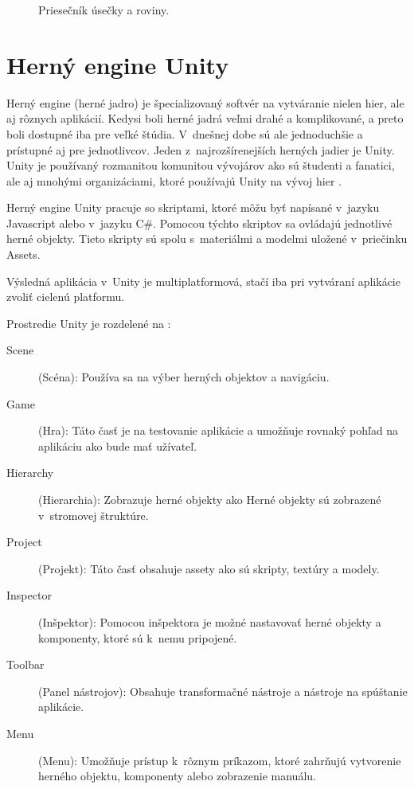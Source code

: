 \begin{figure}[H]
\centering
{}
\caption{Priesečník úsečky a roviny.}
\label{fig:Intersect}
\end{figure}


\section{Herný engine Unity}

Herný engine (herné jadro) je špecializovaný softvér na vytváranie nielen hier, ale aj rôznych aplikácií. Kedysi boli herné jadrá veľmi drahé a komplikované, a preto boli dostupné iba pre veľké štúdia. V~dnešnej dobe sú ale jednoduchšie a prístupné aj pre jednotlivcov. Jeden z~najrozšírenejších herných jadier je Unity. Unity je používaný rozmanitou komunitou vývojárov ako sú študenti a fanatici, ale aj mnohými organizáciami, ktoré používajú Unity na vývoj hier \cite{smith2013unity}.

Herný engine Unity pracuje so skriptami, ktoré môžu byť napísané v~jazyku Javascript alebo v~jazyku C\#.
Pomocou týchto skriptov sa ovládajú jednotlivé herné objekty. Tieto skripty sú spolu s~materiálmi a modelmi uložené v~priečinku Assets.


Výsledná aplikácia v~Unity je multiplatformová, stačí iba pri vytváraní aplikácie zvoliť cielenú platformu.

Prostredie Unity je rozdelené na \cite{smith2013unity}:
\begin{description}
\item[Scene] (Scéna):
Používa sa na výber herných objektov a navigáciu.
\item[Game] (Hra):
Táto časť je na testovanie aplikácie a umožňuje rovnaký pohľad na aplikáciu ako bude mať užívateľ.
\item[Hierarchy] (Hierarchia):
Zobrazuje herné objekty ako Herné objekty sú zobrazené v~stromovej štruktúre. 
\item[Project] (Projekt):
Táto časť obsahuje assety ako sú skripty, textúry a modely.
\item[Inspector] (Inšpektor):
Pomocou inšpektora je možné nastavovať herné objekty a komponenty, ktoré sú k~nemu pripojené.
\item[Toolbar] (Panel nástrojov):
Obsahuje transformačné nástroje a nástroje na spúštanie aplikácie.
\item[Menu] (Menu):
Umožňuje prístup k~rôznym príkazom, ktoré zahrňujú vytvorenie herného objektu, komponenty alebo zobrazenie manuálu.
\end{description}


